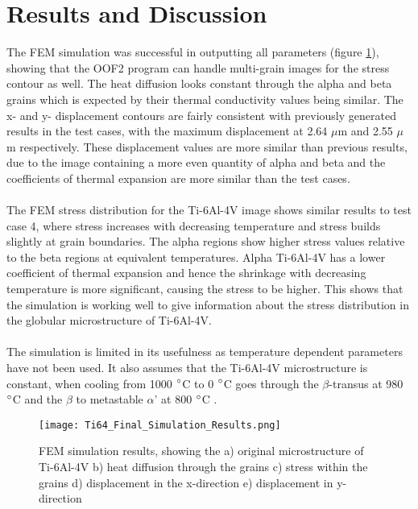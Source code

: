 \documentclass[report.tex]{subfiles}
\begin{document}
\section{Results and Discussion}

The FEM simulation was successful in outputting all parameters (figure \ref{fig:FinalSimulationResults}), showing that the OOF2 program can handle multi-grain images for the stress contour as well. The heat diffusion looks constant through the alpha and beta grains which is expected by their thermal conductivity values being similar. The x- and y- displacement contours are fairly consistent with previously generated results in the test cases, with the maximum displacement at 2.64 $\mu$m and 2.55 $\mu$m respectively. These displacement values are more similar than previous results, due to the image containing a more even quantity of alpha and beta and the coefficients of thermal expansion are more similar than the test cases.\\
\\ 
The FEM stress distribution for the Ti-6Al-4V image shows similar results to test case 4, where  stress increases with decreasing temperature and stress builds slightly at grain boundaries. The alpha regions show higher stress values relative to the beta regions at equivalent temperatures. Alpha Ti-6Al-4V has a lower coefficient of thermal expansion and hence the shrinkage with decreasing temperature is more significant, causing the stress to be higher. This shows that the simulation is working well to give information about the stress distribution in the globular microstructure of Ti-6Al-4V.\\
\\
The simulation is limited in its usefulness as temperature dependent parameters have not been used. It also assumes that the Ti-6Al-4V microstructure is constant, when cooling from 1000 $\degree$C to 0 $\degree$C goes through the $\beta$-transus at 980 $\degree$C and the $\beta$ to metastable $\alpha$' at 800 $\degree$C \cite{Ti64PhaseDiagram}.

\begin{figure}[h!]
    \centering
    \texttt{[image: Ti64\_Final\_Simulation\_Results.png]}
    \caption{FEM simulation results, showing the a) original microstructure of Ti-6Al-4V b) heat diffusion through the grains c) stress    within the grains d) displacement in the x-direction e) displacement in y-direction}
    \label{fig:FinalSimulationResults}
\end{figure}
\end{document}
